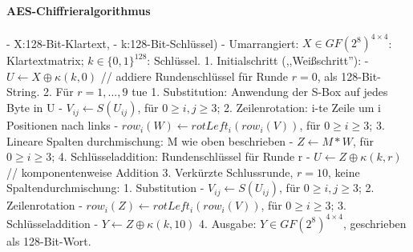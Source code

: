 \documentclass[a4paper]{article}
\begin{document}
\begin{multicols}{3}
    \paragraph{AES-Chiffrieralgorithmus}
    - X:128-Bit-Klartext,
    - k:128-Bit-Schlüssel)
    - Umarrangiert: $X\in GF(2^8)^{4\times 4}$: Klartextmatrix; $k\in\{0,1\}^{128}$: Schlüssel.
    1. Initialschritt (,,Weißschritt''):
    - $U\leftarrow X\oplus \kappa (k,0)$ // addiere Rundenschlüssel für Runde $r=0$, als 128-Bit-String.
    2. Für $r=1,...,9$ tue
    1. Substitution: Anwendung der S-Box auf jedes Byte in U
    - $V_{ij}\leftarrow S(U_{ij})$, für $0\geq i,j\geq 3$;
    2. Zeilenrotation: i-te Zeile um i Positionen nach links
    - $row_i(W)\leftarrow rotLeft_i(row_i(V))$, für $0\geq i\geq 3$;
    3. Lineare Spalten durchmischung: M wie oben beschrieben
    - $Z\leftarrow M*W$, für $0\geq i\geq 3$;
    4. Schlüsseladdition: Rundenschlüssel für Runde r
    - $U\leftarrow Z\oplus \kappa (k,r)$ // komponentenweise Addition
    3. Verkürzte Schlussrunde, $r=10$, keine Spaltendurchmischung:
    1. Substitution
    - $V_{ij}\leftarrow S(U_{ij})$, für $0\geq i,j\geq 3$;
    2. Zeilenrotation
    - $row_i(Z)\leftarrow rotLeft_i(row_i(V))$, für $0\geq i\geq 3$;
    3. Schlüsseladdition
    - $Y\leftarrow Z\oplus \kappa (k,10)$
    4. Ausgabe: $Y\in GF(2^8)^{4\times 4}$, geschrieben als 128-Bit-Wort.


\end{multicols}
\end{document}
